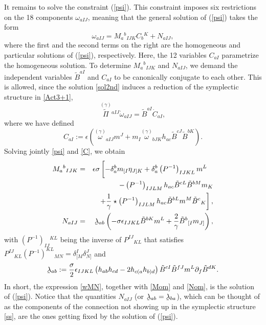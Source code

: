 \documentclass[aps,prd,reprint,showpacs,longbibliography,superscriptaddress, groupedaddres,
titlepage,nofootinbib]{revtex4-1} %
\begin{document}
It remains to solve the constraint (\ref{psi}). This constraint imposes six restrictions on the 18 components $\omega_{aIJ}$, meaning that the general solution of (\ref{psi}) takes the form 
\begin{equation}
	\label{wMN}
	\omega_{aIJ}= M_a{}^b{}_{IJK}C_{b}{}^{K} + N_{aIJ},
\end{equation}
where the first and the second terms on the right are the homogeneous and particular solutions of (\ref{psi}), respectively. Here, the 12 variables $C_{aI}$ parametrize the homogeneous solution. To determine $M_a{}^b{}_{IJK}$ and $N_{aIJ}$, we demand the independent variables $\tilde{B}^{aI}$ and  $C_{aI}$ to be canonically conjugate to each other. This is allowed, since the solution \eqref{sol2nd} induces a reduction of the symplectic structure in \eqref{Act3+1},
\begin{equation}
	\label{ss}
	\stackrel{(\gamma)}{\tilde{\Pi}} {}^{aIJ}\dot{\omega}_{aIJ}=\tilde{B}^{aI}\dot{C}_{aI},
\end{equation}
where we have defined
\begin{equation}
	\label{C}
	C_{aI} := \epsilon \left( \stackrel{(\gamma)}{\omega}\!\!{}_{aIJ}m^J + m_I \stackrel{(\gamma)}{\omega}\!\!{}_{bJK} h_{ac} \tilde{B}^{cJ}\tilde{B}^{bK}\right).
\end{equation} 
Solving jointly \eqref{psi} and \eqref{C}, we obtain 
\begin{eqnarray}
	 M_a{}^b{}_{IJK} &=& \epsilon \sigma \left[ - \delta_{a}^{b} m_{[I} \eta_{J] K} + \delta_{a}^{b} \left( P^{-1}\right)_{I J K L} m^{L} \phantom{\dfrac{1}{2}}\right. \nonumber \\
	 & & - \left( P^{-1}\right)_{I J L M} h_{a c} \tilde{B}^{cL} \tilde{B}^{bM} m_{K}  \nonumber \\
	 & &  \left. +   \dfrac{1}{\gamma}\star \left( P^{-1}\right)_{IJLM} h_{a c} \tilde{B}^{bL}m^{M} \tilde{B}^{c}{}_{K} \right]\label{Mom}, \\
	 \label{N}
	   N_{aIJ} & = & \underaccent{\tilde}{ \lambda}_{ab} \left( -\sigma \epsilon_{IJKL}\tilde{B}^{bK}m^L +\dfrac{2}{\gamma} \tilde{B}^{b}{}_{[I}m_{J]} \right)\label{Nom},
\end{eqnarray}
with $\left( P^{-1}\right)_{IJ}{}^{KL}$ being the inverse of $P^{IJ}{}_{KL}$ that satisfies $ P^{IJ}{}_{KL}(P^{-1})^{KL}{}_{MN}=\delta^I_{[M}\delta^J_{N]}$ and
\begin{equation}
	\underaccent{\tilde}{\lambda}_{ab} := \dfrac{\sigma}{2} \epsilon_{IJKL}\left( h_{ab}h_{cd} - 2 h_{c(a}h_{b)d}\right)\tilde{B}^{cI}\tilde{B}^{fJ}m^{L}\partial_f \tilde{B}^{dK}.
\end{equation}
In short, the expression \eqref{wMN}, together with \eqref{Mom} and \eqref{Nom}, is the solution of (\ref{psi}). Notice that the quantities $N_{aIJ}$ (or $\underaccent{\tilde}{ \lambda}_{ab}=\underaccent{\tilde}{ \lambda}_{ba}$), which can be thought of as the components of the connection not showing up in the symplectic structure \eqref{ss}, are the ones getting fixed by the solution of (\ref{psi}).
\end{document}
